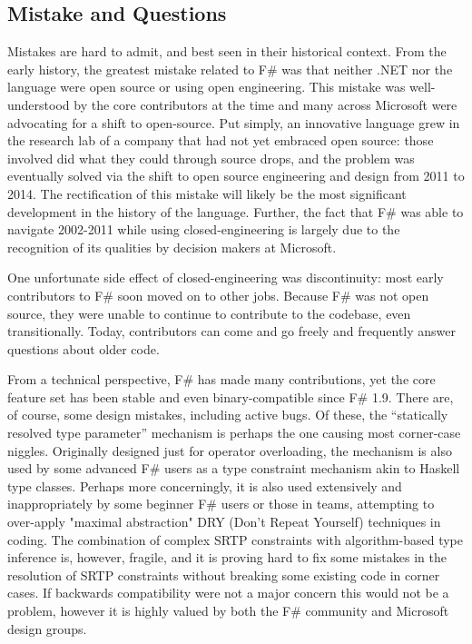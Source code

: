\documentclass[acmsmall]{acmart}\settopmatter{}
\begin{document}
\subsection*{Mistake and Questions}

Mistakes are hard to admit, and best seen in their historical context.  From the early history,
the greatest mistake related to F\# was that neither .NET nor the language were open source
or using open engineering.  This mistake was well-understood by the core contributors at the time
and many across Microsoft were advocating for a shift to open-source. Put simply, an innovative language
grew in the research lab of a company that had not yet embraced open source: those involved did
what they could through source drops, and the problem was eventually solved via the shift to open
source engineering and design from 2011 to 2014. The rectification of this mistake will likely be
the most significant development in the history of the language. Further, the fact
that F\# was able to navigate 2002-2011 while using closed-engineering is largely due to the
recognition of its qualities by decision makers at Microsoft.

One unfortunate side effect of closed-engineering was discontinuity: most early
contributors to F\# soon moved on to other jobs. Because F\# was not open source, they
were unable to continue to contribute to the codebase, even transitionally. Today, contributors
can come and go freely and frequently answer questions about older code.

From a technical perspective, F\# has made many contributions, yet the core feature set has
been stable and even binary-compatible since F\# 1.9.  There are, of course, some
design mistakes, including active bugs.  Of these, the “statically resolved type parameter”
mechanism is perhaps the one causing most corner-case niggles. Originally designed just for
operator overloading, the mechanism is also used by some advanced F\# users as a type constraint
mechanism akin to Haskell type classes. Perhaps more concerningly, it is also used extensively
and inappropriately by some beginner F\# users or those in teams, attempting to
over-apply "maximal abstraction" DRY (Don't Repeat Yourself) techniques in coding.   The combination of complex SRTP constraints
with algorithm-based type inference is, however, fragile, and it is proving hard to fix some
mistakes in the resolution of SRTP constraints without breaking some existing code in
corner cases.  If backwards compatibility were not a major concern this would not be
a problem, however it is highly valued by both the F\# community and Microsoft design groups.
\end{document}
